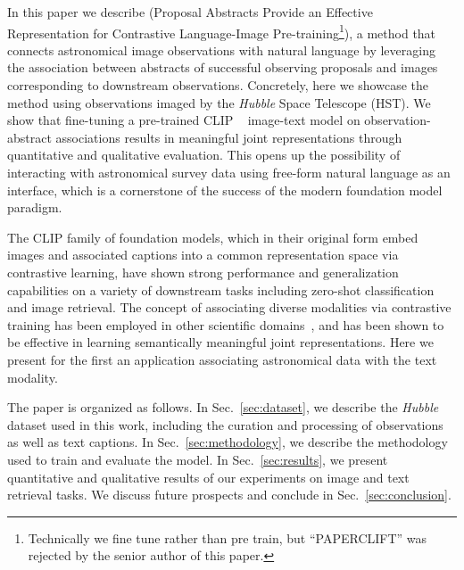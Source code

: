 \documentclass[10pt]{article} %
\newcommand{\SM}[1]{\textcolor{blue}{[SM: #1]}}
\newcommand{\hubble}{\emph{Hubble}\xspace}
\begin{document}
In this paper we describe  (Proposal Abstracts Provide an Effective Representation for Contrastive Language-Image Pre-training\footnote{Technically we fine tune rather than pre train, but ``PAPERCLIFT'' was rejected by the senior author of this paper.}), a method that connects astronomical image observations with natural language by leveraging the association between abstracts of successful observing proposals and images corresponding to downstream observations. 
%
Concretely, here we showcase the method using observations imaged by the \hubble Space Telescope (HST).
%
We show that fine-tuning a pre-trained CLIP ~\citep[Contrastive Language-Image Pre-training; ][]{radford2021learning} image-text model on observation-abstract associations results in meaningful joint representations through quantitative and qualitative evaluation.
%
This opens up the possibility of interacting with astronomical survey data using free-form natural language as an interface, which is a cornerstone of the success of the modern foundation model paradigm.
%

The CLIP family of foundation models, which in their original form embed images and associated captions into a common representation space via contrastive learning, have shown strong performance and generalization capabilities on a variety of downstream tasks including zero-shot classification and image retrieval.
%
The concept of associating diverse modalities via contrastive training has been employed in other scientific domains~\citep[e.g.,][]{liu2023text,Sanchez-Fernandez2022.11.17.516915,lanusse2023astroclip,cepeda2023geoclip}, and has been shown to be effective in learning semantically meaningful joint representations. Here we present for the first an application associating astronomical data with the text modality.


The paper is organized as follows.
%
In Sec.~\ref{sec:dataset}, we describe the \hubble dataset used in this work, including the curation and processing of observations as well as text captions.
%
In Sec.~\ref{sec:methodology}, we describe the methodology used to train and evaluate the model.
%
In Sec.~\ref{sec:results}, we present quantitative and qualitative results of our experiments on image and text retrieval tasks.
%
We discuss future prospects and conclude in Sec.~\ref{sec:conclusion}.
\end{document}
